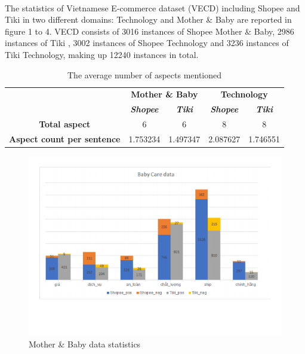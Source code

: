 \paragraph{}
The statistics of Vietnamese E-commerce dataset (VECD) including Shopee and Tiki in two different domains:  Technology and Mother \& Baby are reported in figure 1 to 4. VECD consists of 3016 instances of Shopee Mother \& Baby, 2986 instances of Tiki , 3002 instances of Shopee Technology and 3236 instances of Tiki Technology, making up 12240 instances in total.

\begin{table}[h]
\centering
\begin{tabular}{|l|c|c|c|c|}
\hline
\multirow{2}{*}{}                                        & \multicolumn{2}{c|}{\textbf{Mother \& Baby}}           & \multicolumn{2}{c|}{\textbf{Technology}}                \\ \cline{2-5} 
                                                         & \textit{\textbf{Shopee}} & \textit{\textbf{Tiki}} & \textit{\textbf{Shopee}} & \textit{\textbf{Tiki}} \\ \hline
\multicolumn{1}{|c|}{\textbf{Total aspect}}              & 6                        & 6                      & 8                        & 8                      \\ \hline
\multicolumn{1}{|c|}{\textbf{Aspect count per sentence}} & 1.753234                 & 1.497347               & 2.087627                 & 1.746551               \\ \hline
\end{tabular}
\caption{The average number of aspects mentioned}
\end{table}

\begin{figure}[h]
	\centering
	\includegraphics[width=\linewidth]{Chapter2/Figs/baby care.pdf}
	\caption{Mother \& Baby data statistics}
	\label{fig:baby}
\end{figure}

